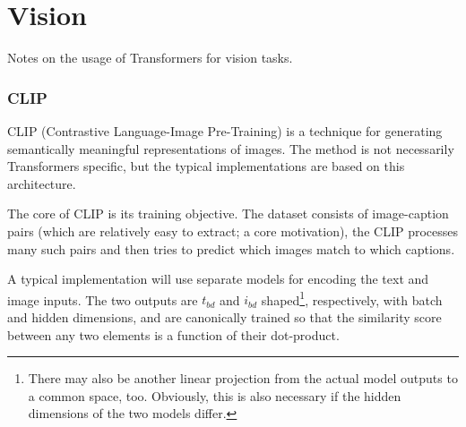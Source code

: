 \part{Vision}

Notes on the usage of Transformers for vision tasks.


\section{CLIP}

CLIP (Contrastive Language-Image Pre-Training) \cite{radford2021learningtransferablevisualmodels} is
a technique for generating semantically meaningful representations of images. The method is not
necessarily Transformers specific, but the typical implementations are based on this architecture.

The core of CLIP is its training objective. The dataset consists of image-caption pairs (which are
relatively easy to extract; a core motivation), the CLIP processes many such pairs and then tries to
predict which images match to which captions.

A typical implementation will use separate models for encoding the text and image inputs. The two
outputs are $ t _{ bd } $ and $ i _{ bd } $ shaped\footnote{There may also be another linear
projection from the actual model outputs to a common space, too. Obviously, this is also necessary
if the hidden dimensions of the two models differ.}, respectively, with batch and hidden dimensions,
and are canonically trained so that the similarity score between any two elements is a function of
their dot-product.

